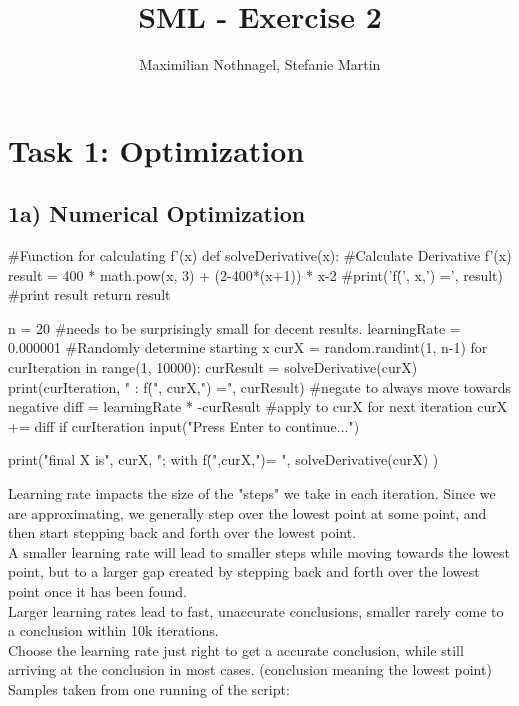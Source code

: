 \documentclass{article}
\title{SML - Exercise 2}
\author{Maximilian Nothnagel, Stefanie Martin}
\date{}
\begin{document}
	
	\maketitle
	
	\section{Task 1: Optimization}
	\subsection{1a) Numerical Optimization}
		\begin{python}
		#Function for calculating f'(x)
		def solveDerivative(x):
		#Calculate Derivative f'(x)
		result = 400 * math.pow(x, 3) + (2-400*(x+1)) * x-2 
		#print('f\'(', x,') =', result) #print result
		return result
		
		n = 20
		#needs to be surprisingly small for decent results. 
		learningRate = 0.000001 
		#Randomly determine starting x
		curX = random.randint(1, n-1) 
		for curIteration in range(1, 10000):
		curResult = solveDerivative(curX) 
		print(curIteration, " : f\'(", curX,") =", curResult)
		#negate to always move towards negative
		diff = learningRate * -curResult 
		#apply to curX for next iteration
		curX += diff 
		if curIteration %
		input("Press Enter to continue...")
		
		print("final X is", curX, "; with f\'(",curX,")= ", solveDerivative(curX) )	
		\end{python}
	Learning rate impacts the size of the "steps" we take in each iteration. Since we are approximating, we generally step over the lowest point at some point, and then start stepping back and forth over the lowest point. \\
	A smaller learning rate will lead to smaller steps while moving towards the lowest point, but to a larger gap created by stepping back and forth over the lowest point once it has been found.\\
	Larger learning rates lead to fast, unaccurate conclusions, smaller rarely come to a conclusion within 10k iterations.\\
	Choose the learning rate just right to get a accurate conclusion, while still arriving at the conclusion in most cases.
	(conclusion meaning the lowest point)\\
	Samples taken from one running of the script: \\
\end{document}
